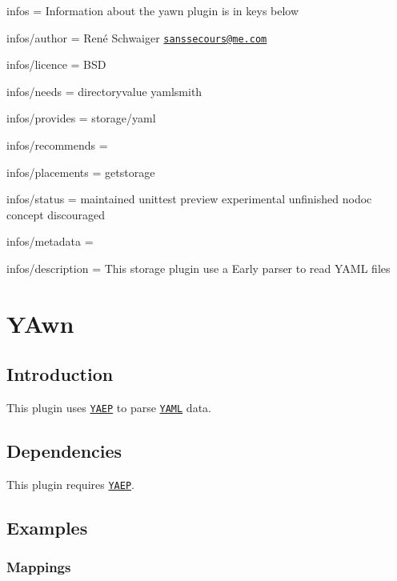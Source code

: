 
\begin{DoxyItemize}
\item infos = Information about the yawn plugin is in keys below
\item infos/author = René Schwaiger \href{mailto:sanssecours@me.com}{\tt sanssecours@me.\+com}
\item infos/licence = B\+SD
\item infos/needs = directoryvalue yamlsmith
\item infos/provides = storage/yaml
\item infos/recommends =
\item infos/placements = getstorage
\item infos/status = maintained unittest preview experimental unfinished nodoc concept discouraged
\item infos/metadata =
\item infos/description = This storage plugin use a Early parser to read Y\+A\+ML files
\end{DoxyItemize}\hypertarget{md_src_plugins_yawn_README_src_plugins_yawn_README_md}{}\section{Y\+Awn}\label{md_src_plugins_yawn_README_src_plugins_yawn_README_md}
\subsection*{Introduction}

This plugin uses \href{https://github.com/vnmakarov/yaep}{\tt Y\+A\+EP} to parse \href{http://yaml.org}{\tt Y\+A\+ML} data.

\subsection*{Dependencies}

This plugin requires \href{https://github.com/vnmakarov/yaep#installing}{\tt Y\+A\+EP}.

\subsection*{Examples}

\subsubsection*{Mappings}


